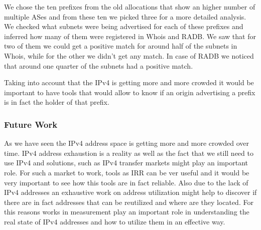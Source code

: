 \documentclass[11pt,a4paper]{scrreprt}
\begin{document}
We chose the ten prefixes from the old allocations that show an higher number of multiple ASes and from these ten we picked three for a more detailed analysis. We checked what subnets were being advertised for each of these prefixes and inferred how many of them were registered in Whois and RADB. We saw that for two of them we could get a positive match for around half of the subnets in Whois, while for the other we didn't get any match. In case of RADB we noticed that around one quarter of the subnets had a positive match. 

Taking into account that the IPv4 is getting more and more crowded it would be important to have tools that would allow to know if an origin advertising a prefix is in fact the holder of that prefix.  

\subsubsection{Future Work}

As we have seen the IPv4 address space is getting more and more crowded over time. IPv4 address exhaustion is a reality as well as the fact that we still need to use IPv4 and solutions, such as IPv4 transfer markets might play an important role. For such a market to work, tools as IRR can be ver useful and it would be very important to see how this tools are in fact reliable. Also due to the lack of IPv4 addresses an exhaustive work on address utilization might help to discover if there are in fact addresses that can be reutilized and where are they located.
For this reasons works in measurement play an important role in understanding the real state of IPv4 addresses and how to utilize them in an effective way.
\end{document}
